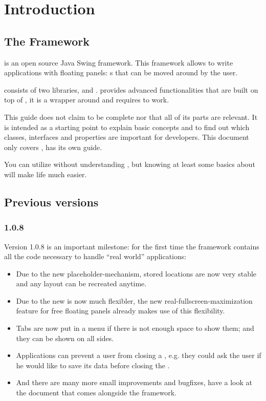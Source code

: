 \section{Introduction}
\subsection{The Framework}
 is an open source Java Swing framework. This framework allows to write applications with floating panels: s that can be moved around by the user.

 consists of two libraries,  and .  provides advanced functionalities that are built on top of , it is a wrapper around  and requires  to work.

This guide does not claim to be complete nor that all of its parts are relevant. It is intended as a starting point to explain basic concepts and to find out which classes, interfaces and properties are important for developers. This document only covers ,  has its own guide. 

You can utilize  without understanding , but knowing at least some basics about  will make life much easier.

\subsection{Previous versions}
\subsubsection{1.0.8}
Version 1.0.8 is an important milestone: for the first time the framework contains all the code necessary to handle ``real world'' applications:
\begin{itemize}
 \item Due to the new placeholder-mechanism, stored locations are now very stable and any layout can be recreated anytime.
 \item Due to the new   is now much flexibler, the new real-fullscreen-maximization feature for free floating panels already makes use of this flexibility.
 \item Tabs are now put in a menu if there is not enough space to show them; and they can be shown on all sides.
 \item Applications can prevent a user from closing a , e.g. they could ask the user if he would like to save its data before closing the .
 \item And there are many more small improvements and bugfixes, have a look at the  document that comes alongside the framework.
\end{itemize}

